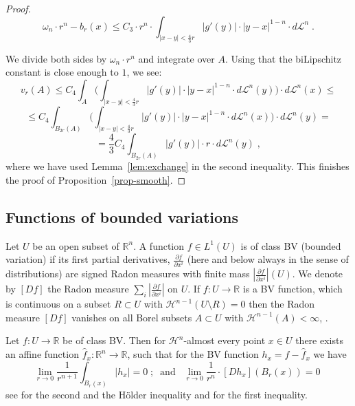 \documentclass[12pt,leqno]{amsart}
\numberwithin{equation}{section}
\theoremstyle{definition}
\theoremstyle{remark}
\newtheorem{rem}[thm]{Remark}
\newcommand{\lref}[1]{Lemma~\ref{#1}}
\newcommand{\R}{\mathbb{R}}
\def\co{\colon\thinspace}
\begin{document}
\begin{proof}
\[
\omega _n \cdot r^n - b_r (x) \leq C_3\cdot r^n \cdot \int _{|x-y|< \frac 4 3 r}  |g'(y)| \cdot |y-x|^{1-n} \cdot d\mathcal L^n \; .
\]

We divide both sides  by $\omega _n \cdot  r^n$ and integrate over $A$. Using that the biLipschitz constant is close enough to $1$,  we see:
$$v_r (A) \leq C_4 \int _A  \Big (\int _{|x-y|< \frac 4 3 r}  |g'(y)|  \cdot |y-x|^{1-n}\cdot d\mathcal L^n (y) \Big ) \cdot d\mathcal L^n (x)  \leq$$
$$\leq C_4 \int _{B_{2r} (A)} \Big ( \int  _{|x-y|< \frac 4 3 r} |g'(y)|  \cdot |y-x|^{1-n} \cdot d\mathcal L^n (x) \Big ) \cdot d\mathcal L^n (y) = $$
$$= \frac 4 3 C_4 \int _{B_{2r} (A)} |g'(y)| \cdot r \cdot d\mathcal L^n (y) \; ,$$
where we have used \lref{lem:exchange} in the second inequality.
   This  finishes the proof of  Proposition~\ref{prop-smooth}.
\end{proof}



\subsection{Functions of bounded variations}
Let $U$ be an open subset of $\R^n$. A function $f\in L^1 (U)$ is of class  BV (bounded variation) if its first partial derivatives,
 $\frac{\partial f}{\partial x^i}$ (here and below always in the sense of distributions) are signed Radon measures with finite mass
 $|\frac{\partial f}{\partial x^i}|(U)$. We denote by $[Df ]$ the Radon measure $\sum_i |\frac{\partial f}{\partial x^i}|$ on $U$.  If $f:U\to \R$ is a BV function, which is continuous on a subset $R \subset U$ with $\mathcal H^{n-1} (U\setminus R)=0$ then the Radon measure $[Df]$ vanishes on all Borel subsets $A\subset U$ with $\mathcal H^{n-1} (A)<\infty$, \cite{Goffmann}.

Let $f:U\to \R$ be of class BV.  Then  for $\mathcal H^n$-almost every point
$x\in U$ there exists an affine  function $\hat f _x:\R^n\to \R$, such that for the BV function $h_x=f-\hat f_x$  we have
\begin{equation}\label{DC-ae-diff}
\lim_{r\to 0}\frac 1 {r^{n+1}}  \int _{B_r(x)}|h_x| =0 \; ;\; \;  \text{and} \;  \; \;    \lim _{r\to 0}  \frac 1 {r^n} \cdot   [Dh_x] (B_r (x)) =0 \;
\end{equation}
see \cite[ Theorem 6.1 (2),(3)]{Evans}  for the second and   the H\"older inequality and  \cite[ Theorem 6.1 (1)]{Evans}  for the first inequality.
\end{document}
